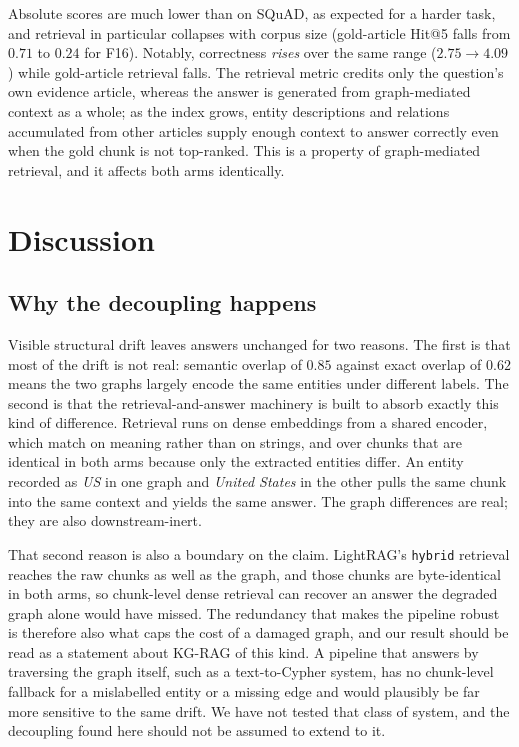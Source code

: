 \documentclass[conference, table]{IEEEtran}
\newcommand{\fsixteen}{F16}
\begin{document}
\noindent
Absolute scores are much lower than on SQuAD, as expected for a harder task, and retrieval in particular collapses with corpus size (gold-article Hit@5 falls from $0.71$ to $0.24$ for \fsixteen). Notably, correctness \emph{rises} over the same range ($2.75 \to 4.09$) while gold-article retrieval falls. The retrieval metric credits only the question's own evidence article, whereas the answer is generated from graph-mediated context as a whole; as the index grows, entity descriptions and relations accumulated from other articles supply enough context to answer correctly even when the gold chunk is not top-ranked. This is a property of graph-mediated retrieval, and it affects both arms identically.

\section{Discussion}\label{sec:discussion}

\subsection{Why the decoupling happens}

\noindent
Visible structural drift leaves answers unchanged for two reasons. The first is that most of the drift is not real: semantic overlap of $0.85$ against exact overlap of $0.62$ means the two graphs largely encode the same entities under different labels. The second is that the retrieval-and-answer machinery is built to absorb exactly this kind of difference. Retrieval runs on dense embeddings from a shared encoder, which match on meaning rather than on strings, and over chunks that are identical in both arms because only the extracted entities differ. An entity recorded as \emph{US} in one graph and \emph{United States} in the other pulls the same chunk into the same context and yields the same answer. The graph differences are real; they are also downstream-inert.

\noindent
That second reason is also a boundary on the claim. LightRAG's \texttt{hybrid} retrieval reaches the raw chunks as well as the graph, and those chunks are byte-identical in both arms, so chunk-level dense retrieval can recover an answer the degraded graph alone would have missed. The redundancy that makes the pipeline robust is therefore also what caps the cost of a damaged graph, and our result should be read as a statement about KG-RAG of this kind. A pipeline that answers by traversing the graph itself, such as a text-to-Cypher system, has no chunk-level fallback for a mislabelled entity or a missing edge and would plausibly be far more sensitive to the same drift. We have not tested that class of system, and the decoupling found here should not be assumed to extend to it.
\end{document}
